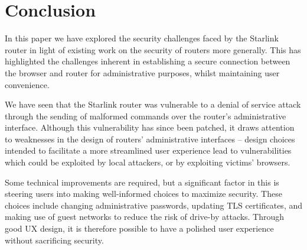 \section{Conclusion}\label{sec:conclusion}

In this paper we have explored the security challenges faced by the Starlink router in light of existing work on the security of routers more generally.
This has highlighted the challenges inherent in establishing a secure connection between the browser and router for administrative purposes, whilst maintaining user convenience.

We have seen that the Starlink router was vulnerable to a denial of service attack through the sending of malformed commands over the router's administrative interface.
Although this vulnerability has since been patched, it draws attention to weaknesses in the design of routers' administrative interfaces -- design choices intended to facilitate a more streamlined user experience lead to vulnerabilities which could be exploited by local attackers, or by exploiting victims' browsers.

Some technical improvements are required, but a significant factor in this is steering users into making well-informed choices to maximize security.
These choices include changing administrative passwords, updating TLS certificates, and making use of guest networks to reduce the risk of drive-by attacks.
Through good UX design, it is therefore possible to have a polished user experience without sacrificing security.

